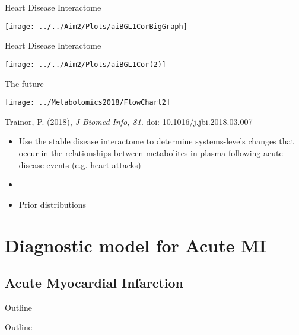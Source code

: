 \documentclass[xcolor=dvipsnames]{beamer}
\begin{document}
\begin{frame}{Heart Disease Interactome}
	\vspace{-10.5pt}
	\begin{center}
		\texttt{[image: ../../Aim2/Plots/aiBGL1CorBigGraph]}
	\end{center}
\end{frame}

\begin{frame}{Heart Disease Interactome}
	\vspace{-10.5pt}
	\begin{center}
		\texttt{[image: ../../Aim2/Plots/aiBGL1Cor(2)]}
	\end{center}
\end{frame}

\begin{frame}{The future}
	\vspace{-15pt}
	\begin{center}
		\texttt{[image: ../Metabolomics2018/FlowChart2]}
		
		Trainor, P. (2018), \emph{J Biomed Info, 81}. doi: 10.1016/j.jbi.2018.03.007 \pause
	\end{center}
	\begin{itemize}
		\item Use the stable disease interactome to determine systems-levels changes that occur in the relationships between metabolites in plasma following acute disease events (e.g. heart attacks) \pause
		\item[]
		\item Prior distributions 
	\end{itemize}
\end{frame}

\section{Diagnostic model for Acute MI}
\subsection{Acute Myocardial Infarction}
\begin{frame}{Outline}
	\vspace{-10.5pt}
	\tableofcontents[currentsection,subsectionstyle=hide]
\end{frame}

\begin{frame}{Outline}
	\vspace{-10.5pt}
	\tableofcontents[currentsection,subsectionstyle=show/shaded/hide]
\end{frame}
\end{document}
